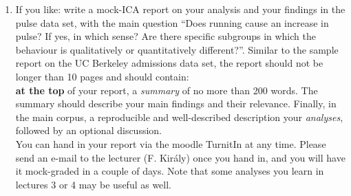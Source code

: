 \begin{enumerate}
\item If you like: write a mock-ICA report on your analysis and your findings in the pulse data set, with the main question ``Does running cause an increase in pulse? If yes, in which sense? Are there specific subgroups in which the behaviour is qualitatively or quantitatively different?''. Similar to the sample report on the UC Berkeley admissions data set, the report should not be longer than 10 pages and should contain:\\
{\bf at the top} of your report, a \emph{summary} of no more than 200 words. The summary should describe your main findings and their relevance. Finally, in the main corpus, a reproducible and well-described description your \emph{analyses}, followed by an optional discussion.\\
You can hand in your report via the moodle TurnitIn at any time. Please send an e-mail to the lecturer (F. Kir\'aly) once you hand in, and you will have it mock-graded in a couple of days. Note that some analyses you learn in lectures 3 or 4 may be useful as well.
    

\end{enumerate}




